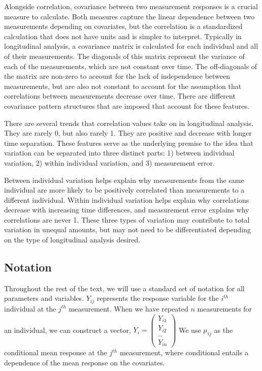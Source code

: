 \documentclass[12pt, twoside]{amherstthesis}
\theoremstyle{definition}
\theoremstyle{definition}
\theoremstyle{definition}
\theoremstyle{remark}
\begin{document}
Alongside correlation, covariance between two measurement responses is a crucial measure to calculate. Both measures capture the linear dependence between two measurements depending on covariates, but the correlation is a standardized calculation that does not have units and is simpler to interpret. Typically in longitudinal analysis, a covariance matrix is calculated for each individual and all of their measurements. The diagonals of this matrix represent the variance of each of the measurements, which are not constant over time. The off-diagonals of the matrix are non-zero to account for the lack of independence between measurements, but are also not constant to account for the assumption that correlations between measurements decrease over time. There are different covariance pattern structures that are imposed that account for these features.

There are several trends that correlation values take on in longitudinal analysis. They are rarely 0, but also rarely 1. They are positive and decrease with longer time separation. These features serve as the underlying premise to the idea that variation can be separated into three distinct parts: 1) between individual variation, 2) within individual variation, and 3) measurement error.

Between individual variation helps explain why measurements from the same individual are more likely to be positively correlated than measurements to a different individual. Within individual variation helps explain why correlations decrease with increasing time differences, and measurement error explains why correlations are never 1. These three types of variation may contribute to total variation in unequal amounts, but may not need to be differentiated depending on the type of longitudinal analysis desired.

\hypertarget{notation}{%
\subsection{Notation}\label{notation}}

Throughout the rest of the text, we will use a standard set of notation for all parameters and variables. \(Y_{ij}\) represents the response variable for the \(i^{th}\) individual at the \(j^{th}\) measurement. When we have repeated \(n\) measurements for an individual, we can construct a vector, \(Y_i = \begin{pmatrix} Y_{i1}\\ Y_{i2} \\ .. \\ Y_{in} \end{pmatrix}\) We use \(\mu_{ij}\) as the conditional mean response at the \(j^{th}\) measurement, where conditional entails a dependence of the mean response on the covariates.
\end{document}
